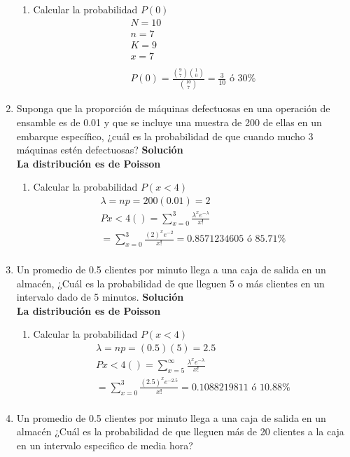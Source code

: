 \begin{enumerate}
\begin{enumerate}
        \item Calcular la probabilidad $P(0)$ \\
        \begin{gather*}
        N = 10\\
        n = 7\\
        K=9\\
        x=7\\\\
        P(0)=\frac{\binom{9}{7}\binom{1}{0}}{\binom{10}{7}} = \frac{3}{10} \text{ ó }30\%
        \end{gather*}
    \end{enumerate}
    
    \item Suponga que la proporción de máquinas defectuosas en una operación de ensamble es de 0.01 y que se incluye una muestra de 200 de ellas en un embarque específico, ¿cuál es la probabilidad de que cuando mucho 3 máquinas estén defectuosas?
    \textbf{Solución}\\
    \textbf{La distribución es de Poisson}
    \begin{enumerate}
        \item Calcular la probabilidad $P(x<4)$ \\
        \begin{gather*}
        \lambda = np= 200(0.01) = 2\\
        Px<4()=\sum_{x=0}^{3}\frac{\lambda^{x}e^{-\lambda}}{x!}\\
        = \sum_{x=0}^{3}\frac{(2)^{x}e^{-2}}{x!}=0.8571234605\text{ ó } 85.71\%\\
        \end{gather*}
    \end{enumerate}
    
    \item Un promedio de 0.5 clientes por minuto llega a una caja de salida en un almacén, ¿Cuál es la probabilidad de que lleguen 5 o más clientes en un intervalo dado de 5 minutos.
    \textbf{Solución}\\
    \textbf{La distribución es de Poisson}
    \begin{enumerate}
        \item Calcular la probabilidad $P(x<4)$ \\
        \begin{gather*}
        \lambda = np=(0.5)(5) = 2.5\\
        Px<4()=\sum_{x=5}^{\infty}\frac{\lambda^{x}e^{-\lambda}}{x!}\\
        = \sum_{x=0}^{3}\frac{(2.5)^{x}e^{-2.5}}{x!}=0.1088219811\text{ ó } 10.88\%\\
        \end{gather*}
    \end{enumerate}
    \item Un promedio de 0.5 clientes por minuto llega a una caja de salida en un almacén ¿Cuál es la probabilidad de que lleguen más de 20 clientes a la caja en un intervalo especifico de media hora? \\
    

\end{enumerate}
